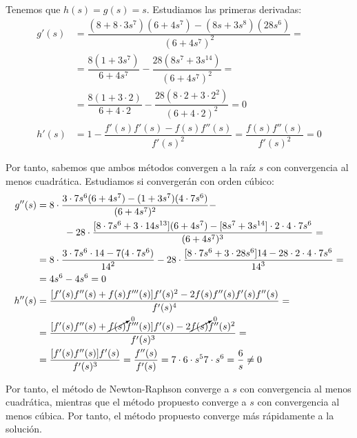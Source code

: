 \begin{ejercicio}
\begin{enumerate}
        Tenemos que $h(s)=g(s)=s$. Estudiamos las primeras derivadas:
        \begin{align*}
            g'(s) &= \dfrac{(8+8\cdot 3s^7)(6+4s^7) - (8s+3s^8)(28s^6)}{(6+4s^7)^2}
            =\\&= \dfrac{8(1+3s^7)}{6+4s^7} - \dfrac{28\left(8s^7+3s^{14}\right)}{(6+4s^7)^2}
            =\\&= \dfrac{8(1+3\cdot 2)}{6+4\cdot 2} - \dfrac{28\left(8\cdot 2+3\cdot 2^2\right)}{(6+4\cdot 2)^2}=0\\
            h'(s) &= 1 - \dfrac{f'(s)f'(s) - f(s)f''(s)}{f'(s)^2} = \dfrac{f(s)f''(s)}{f'(s)^2} = 0
        \end{align*}

        Por tanto, sabemos que ambos métodos convergen a la raíz $s$ con convergencia al menos cuadrática. Estudiamos si convergerán con orden cúbico:
        \begin{align*}
            g''(s) &= 8\cdot \dfrac{3\cdot 7s^6(6+4s^7) - (1+3s^7)(4\cdot 7s^6)}{(6+4s^7)^2} -\\&\hspace{1cm}- 28\cdot \dfrac{[8\cdot 7s^6+3\cdot 14s^{13}](6+4s^7)-[8s^7+3s^{14}]\cdot 2\cdot 4\cdot 7s^6}{(6+4s^7)^3}
            =\\&= 8\cdot \dfrac{3\cdot 7s^6\cdot 14 - 7(4\cdot 7s^6)}{{14}^2} - 28\cdot \dfrac{[8\cdot 7s^6+3\cdot 28s^{6}]14-28\cdot 2\cdot 4\cdot 7s^6}{{14}^3}
            =\\&= 4s^6 - 4s^6 = 0\\
            h''(s) &= \dfrac{[f'(s)f''(s)+f(s)f'''(s)]f'(s)^2 - 2f(s)f''(s)f'(s)f''(s)}{f'(s)^4}
            =\\&= \dfrac{[f'(s)f''(s)+\cancelto{0}{f(s)}f'''(s)]f'(s) - 2\cancelto{0}{f(s)}f''(s)^2}{f'(s)^3}
            =\\&= \dfrac{[f'(s)f''(s)]f'(s)}{f'(s)^3} = \dfrac{f''(s)}{f'(s)} = {7\cdot 6\cdot s^5}{7\cdot s^6} = \dfrac{6}{s}\neq 0
        \end{align*}

        Por tanto, el método de Newton-Raphson converge a $s$ con convergencia al menos cuadrática, mientras que el método propuesto converge a $s$ con convergencia al menos cúbica. Por tanto, el método propuesto converge más rápidamente a la solución.
    \end{enumerate}
\end{ejercicio}

